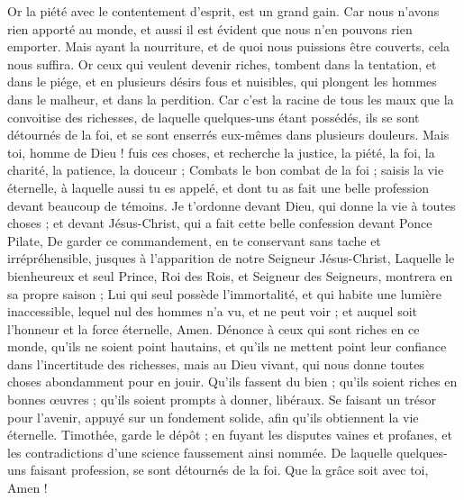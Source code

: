 \begin{multicols}{2}
Or la piété avec le contentement d'esprit, est un grand gain.
Car nous n'avons rien apporté au monde, et aussi il est évident que nous n'en pouvons rien emporter.
Mais ayant la nourriture, et de quoi nous puissions être couverts, cela nous suffira.
Or ceux qui veulent devenir riches, tombent dans la tentation, et dans le piége, et en plusieurs désirs fous et nuisibles, qui plongent les hommes dans le malheur, et dans la perdition.
Car c'est la racine de tous les maux que la convoitise des richesses, de laquelle quelques-uns étant possédés, ils se sont détournés de la foi, et se sont enserrés eux-mêmes dans plusieurs douleurs.
Mais toi, homme de Dieu ! fuis ces choses, et recherche la justice, la piété, la foi, la charité, la patience, la douceur ;
Combats le bon combat de la foi ; saisis la vie éternelle, à laquelle aussi tu es appelé, et dont tu as fait une belle profession devant beaucoup de témoins.
Je t'ordonne devant Dieu, qui donne la vie à toutes choses ; et devant Jésus-Christ, qui a fait cette belle confession devant Ponce Pilate,
De garder ce commandement, en te conservant sans tache et irrépréhensible, jusques à l'apparition de notre Seigneur Jésus-Christ,
Laquelle le bienheureux et seul Prince, Roi des Rois, et Seigneur des Seigneurs, montrera en sa propre saison ;
Lui qui seul possède l'immortalité, et qui habite une lumière inaccessible, lequel nul des hommes n'a vu, et ne peut voir ; et auquel soit l'honneur et la force éternelle, Amen.
Dénonce à ceux qui sont riches en ce monde, qu'ils ne soient point hautains, et qu'ils ne mettent point leur confiance dans l'incertitude des richesses, mais au Dieu vivant, qui nous donne toutes choses abondamment pour en jouir.
Qu'ils fassent du bien ; qu'ils soient riches en bonnes œuvres ; qu'ils soient prompts à donner, libéraux.
Se faisant un trésor pour l'avenir, appuyé sur un fondement solide, afin qu'ils obtiennent la vie éternelle.
Timothée, garde le dépôt ; en fuyant les disputes vaines et profanes, et les contradictions d'une science faussement ainsi nommée.
De laquelle quelques-uns faisant profession, se sont détournés de la foi. Que la grâce soit avec toi, Amen !
\PPE{}
\end{multicols}
